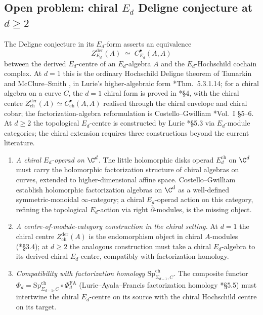 \subsection{Open problem: chiral
  \texorpdfstring{$E_d$}{Ed} Deligne conjecture at
  \texorpdfstring{$d\geq 2$}{d>=2}}\label{ssec:open-chiral-Ed-Deligne}

The Deligne conjecture in its $E_d$-form asserts an equivalence
\[
  Z^{\mathrm{der}}_{E_d}(A)
    \;\simeq\;
    C^\bullet_{E_d}(A,A)
\]
between the derived $E_d$-centre of an $E_d$-algebra $A$ and the
$E_d$-Hochschild cochain complex.  At $d=1$ this is the ordinary
Hochschild Deligne theorem of Tamarkin
\cite{tamarkin-deligne} and McClure--Smith
\cite{mcclure-smith}, in Lurie's higher-algebraic form
\cite{lurie-ha}*{Thm.~5.3.1.14}; for a chiral algebra on a curve \(C\),
the \(d=1\) chiral form is proved in
\cite{beilinson-drinfeld-chiral}*{\S 4}, with the chiral centre
$Z^{\mathrm{der}}_{\mathrm{ch}}(A)\simeq C^\bullet_{\mathrm{ch}}(A,A)$
realised through the chiral envelope and chiral cobar; the
factorization-algebra reformulation is Costello--Gwilliam
\cite{costello-gwilliam}*{Vol.~I \S 5--6}.  At $d\geq 2$ the
topological $E_d$-centre is constructed by Lurie
\cite{lurie-ha}*{\S 5.3} via $E_d$-module categories; the chiral
extension requires three constructions beyond the current
literature.

\begin{enumerate}
  \item \emph{A chiral $E_d$-operad on $\C^d$.}  The little
    holomorphic disks operad $E_d^{\mathrm{ch}}$ on $\C^d$ must
    carry the holomorphic factorization structure of chiral algebras
    on curves, extended to higher-dimensional affine space.
    Costello--Gwilliam
    \cites{costello-gwilliam}{costello-gwilliam-vol2} establish
    holomorphic factorization algebras on $\C^d$ as a well-defined
    symmetric-monoidal $\infty$-category; a chiral $E_d$-operad
    action on this category, refining the topological $E_d$-action
    via right $\overline\partial$-modules, is the missing object.
  \item \emph{A centre-of-module-category construction in the
    chiral setting.}  At $d=1$ the chiral centre
    $Z^{\mathrm{der}}_{\mathrm{ch}}(A)$ is the endomorphism object
    in chiral $A$-modules
    (\cite{beilinson-drinfeld-chiral}*{\S 3.4}); at $d\geq 2$ the
    analogous construction must take a chiral $E_d$-algebra to its
    derived chiral $E_d$-centre, compatibly with factorization
    homology.
  \item \emph{Compatibility with factorization homology
    $\mathrm{Sp}^{\mathrm{ch}}_{\Sigma_{d-1},C}$.}  The composite
    functor $\Phi_d=\mathrm{Sp}^{\mathrm{ch}}_{\Sigma_{d-1},C}\circ
    \Phi^{\mathrm{FA}}_d$
    (Lurie--Ayala--Francis factorization homology
    \cite{lurie-ha}*{\S 5.5}) must intertwine the chiral
    $E_d$-centre on its source with the chiral Hochschild centre
    on its target.
\end{enumerate}

